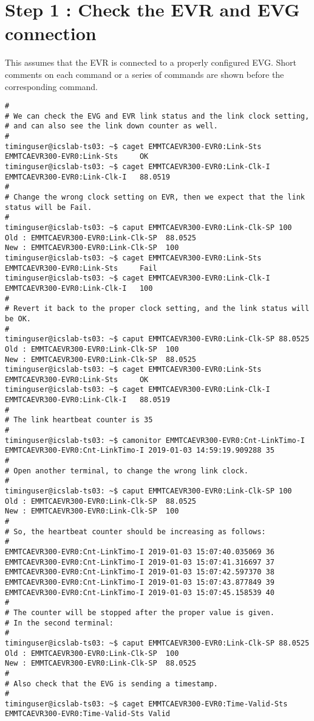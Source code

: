 \documentclass[11pt
  , a4paper
  , article
  , oneside
  , showtrims
]{memoir}
\begin{document}
{\section{Step 1 : Check the EVR and EVG connection}
This assumes that the EVR is connected to a properly configured EVG. Short comments on each command or a series of commands are shown before the corresponding command.
\begin{lstlisting}[style=termstyle]
#
# We can check the EVG and EVR link status and the link clock setting,
# and can also see the link down counter as well.
#
timinguser@icslab-ts03: ~$ caget EMMTCAEVR300-EVR0:Link-Sts
EMMTCAEVR300-EVR0:Link-Sts     OK
timinguser@icslab-ts03: ~$ caget EMMTCAEVR300-EVR0:Link-Clk-I
EMMTCAEVR300-EVR0:Link-Clk-I   88.0519
#
# Change the wrong clock setting on EVR, then we expect that the link status will be Fail.
#
timinguser@icslab-ts03: ~$ caput EMMTCAEVR300-EVR0:Link-Clk-SP 100
Old : EMMTCAEVR300-EVR0:Link-Clk-SP  88.0525
New : EMMTCAEVR300-EVR0:Link-Clk-SP  100
timinguser@icslab-ts03: ~$ caget EMMTCAEVR300-EVR0:Link-Sts
EMMTCAEVR300-EVR0:Link-Sts     Fail
timinguser@icslab-ts03: ~$ caget EMMTCAEVR300-EVR0:Link-Clk-I
EMMTCAEVR300-EVR0:Link-Clk-I   100
#
# Revert it back to the proper clock setting, and the link status will be OK.
#
timinguser@icslab-ts03: ~$ caput EMMTCAEVR300-EVR0:Link-Clk-SP 88.0525
Old : EMMTCAEVR300-EVR0:Link-Clk-SP  100
New : EMMTCAEVR300-EVR0:Link-Clk-SP  88.0525
timinguser@icslab-ts03: ~$ caget EMMTCAEVR300-EVR0:Link-Sts
EMMTCAEVR300-EVR0:Link-Sts     OK
timinguser@icslab-ts03: ~$ caget EMMTCAEVR300-EVR0:Link-Clk-I
EMMTCAEVR300-EVR0:Link-Clk-I   88.0519
#
# The link heartbeat counter is 35
#
timinguser@icslab-ts03: ~$ camonitor EMMTCAEVR300-EVR0:Cnt-LinkTimo-I
EMMTCAEVR300-EVR0:Cnt-LinkTimo-I 2019-01-03 14:59:19.909288 35
#
# Open another terminal, to change the wrong link clock.
#
timinguser@icslab-ts03: ~$ caput EMMTCAEVR300-EVR0:Link-Clk-SP 100
Old : EMMTCAEVR300-EVR0:Link-Clk-SP  88.0525
New : EMMTCAEVR300-EVR0:Link-Clk-SP  100
#
# So, the heartbeat counter should be increasing as follows:
#
EMMTCAEVR300-EVR0:Cnt-LinkTimo-I 2019-01-03 15:07:40.035069 36
EMMTCAEVR300-EVR0:Cnt-LinkTimo-I 2019-01-03 15:07:41.316697 37
EMMTCAEVR300-EVR0:Cnt-LinkTimo-I 2019-01-03 15:07:42.597370 38
EMMTCAEVR300-EVR0:Cnt-LinkTimo-I 2019-01-03 15:07:43.877849 39
EMMTCAEVR300-EVR0:Cnt-LinkTimo-I 2019-01-03 15:07:45.158539 40
#
# The counter will be stopped after the proper value is given.
# In the second terminal:
#
timinguser@icslab-ts03: ~$ caput EMMTCAEVR300-EVR0:Link-Clk-SP 88.0525
Old : EMMTCAEVR300-EVR0:Link-Clk-SP  100
New : EMMTCAEVR300-EVR0:Link-Clk-SP  88.0525
#
# Also check that the EVG is sending a timestamp.
#
timinguser@icslab-ts03: ~$ caget EMMTCAEVR300-EVR0:Time-Valid-Sts
EMMTCAEVR300-EVR0:Time-Valid-Sts Valid
\end{lstlisting}


}
\end{document}
